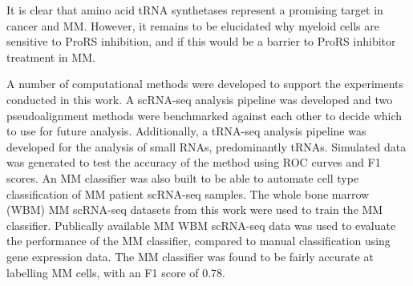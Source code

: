 It is clear that amino acid tRNA synthetases represent a promising target in cancer and MM\@.
However, it remains to be elucidated why myeloid cells are sensitive to ProRS inhibition, and if this would be a barrier to ProRS inhibitor treatment in MM\@.

A number of computational methods were developed to support the experiments conducted in this work.
A scRNA-seq analysis pipeline was developed and two pseudoalignment methods were benchmarked against each other to decide which to use for future analysis.
Additionally, a tRNA-seq analysis pipeline was developed for the analysis of small RNAs, predominantly tRNAs.
Simulated data was generated to test the accuracy of the method using ROC curves and F1 scores.
An MM classifier was also built to be able to automate cell type classification of MM patient scRNA-seq samples.
The whole bone marrow (WBM) MM scRNA-seq datasets from this work were used to train the MM classifier.
Publically available MM WBM scRNA-seq data was used to evaluate the performance of the MM classifier, compared to manual classification using gene expression data.
The MM classifier was found to be fairly accurate at labelling MM cells, with an F1 score of 0.78.





